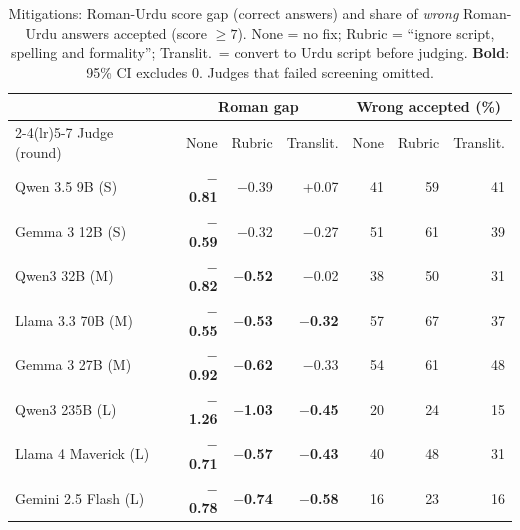 \begin{table}[t]
\centering
\caption{Mitigations: Roman-Urdu score gap (correct answers) and share of \emph{wrong} Roman-Urdu answers accepted (score $\geq 7$). None = no fix; Rubric = ``ignore script, spelling and formality''; Translit.\ = convert to Urdu script before judging. \textbf{Bold}: 95\% CI excludes 0. Judges that failed screening omitted.}
\label{tab:mitig}
\small
\setlength{\tabcolsep}{3pt}
\begin{tabular}{@{}l rrr rrr@{}}
\toprule
 & \multicolumn{3}{c}{Roman gap} & \multicolumn{3}{c}{Wrong accepted (\%)} \\
\cmidrule(lr){2-4}\cmidrule(lr){5-7}
Judge (round) & None & Rubric & Translit. & None & Rubric & Translit. \\
\midrule
Qwen 3.5 9B (S) & \textbf{$-$0.81} & $-$0.39 & +0.07 & 41 & 59 & 41 \\
Gemma 3 12B (S) & \textbf{$-$0.59} & $-$0.32 & $-$0.27 & 51 & 61 & 39 \\
Qwen3 32B (M) & \textbf{$-$0.82} & \textbf{$-$0.52} & $-$0.02 & 38 & 50 & 31 \\
Llama 3.3 70B (M) & \textbf{$-$0.55} & \textbf{$-$0.53} & \textbf{$-$0.32} & 57 & 67 & 37 \\
Gemma 3 27B (M) & \textbf{$-$0.92} & \textbf{$-$0.62} & $-$0.33 & 54 & 61 & 48 \\
Qwen3 235B (L) & \textbf{$-$1.26} & \textbf{$-$1.03} & \textbf{$-$0.45} & 20 & 24 & 15 \\
Llama 4 Maverick (L) & \textbf{$-$0.71} & \textbf{$-$0.57} & \textbf{$-$0.43} & 40 & 48 & 31 \\
Gemini 2.5 Flash (L) & \textbf{$-$0.78} & \textbf{$-$0.74} & \textbf{$-$0.58} & 16 & 23 & 16 \\
\bottomrule
\end{tabular}
\end{table}